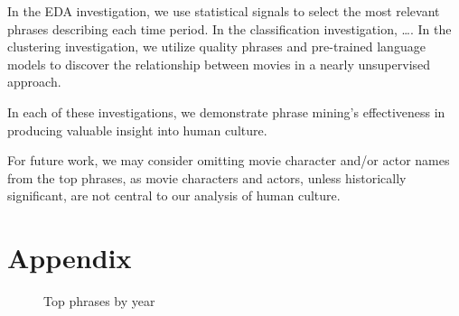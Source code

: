 \documentclass{article}
\begin{document}
\begin{multicols}{2}
In the EDA investigation, we use statistical signals to select the most relevant phrases describing each time period. In the classification investigation, \ldots. In the clustering investigation, we utilize quality phrases and pre-trained language models to discover the relationship between movies in a nearly unsupervised approach.

In each of these investigations, we demonstrate phrase mining's effectiveness in producing valuable insight into human culture.

For future work, we may consider omitting movie character and/or actor names from the top phrases, as movie characters and actors, unless historically significant, are not central to our analysis of human culture.

\nocite{10.1145/2723372.2751523}


\section{Appendix} \label{appendix} %

\begin{figure}
\caption{Top phrases by year}
\centering
{}
\label{figure:top_phrases_by_year}
\end{figure}

\begin{figure}
\ContinuedFloat
\centering
{}
\end{figure}
\end{multicols}
\end{document}
